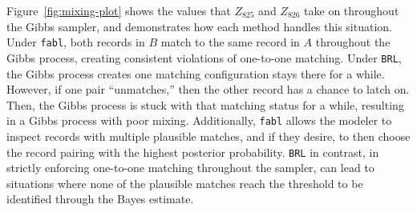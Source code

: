 \documentclass[12pt,letterpaper]{article}
\newcommand{\1}[1]{\mathbb{I}\!\left[#1\right]} %
\begin{document}
Figure~\ref{fig:mixing-plot} shows the values that \(Z_{825}\) and \(Z_{826}\) take on
throughout the Gibbs sampler, and demonstrates how each method handles
this situation. Under \texttt{fabl}, both records in \(B\) match to the
same record in \(A\) throughout the Gibbs process, creating consistent
violations of one-to-one matching. Under \texttt{BRL}, the Gibbs process
creates one matching configuration stays there for a while. However, if
one pair ``unmatches,'' then the other record has a chance to latch on.
Then, the Gibbs process is stuck with that matching status for a while,
resulting in a Gibbs process with poor mixing. Additionally,
\texttt{fabl} allows the modeler to inspect records with multiple
plausible matches, and if they desire, to then choose the record pairing
with the highest posterior probability. \texttt{BRL} in contrast, in
strictly enforcing one-to-one matching throughout the sampler, can lead
to situations where none of the plausible matches reach the threshold to
be identified through the Bayes estimate.
\end{document}
